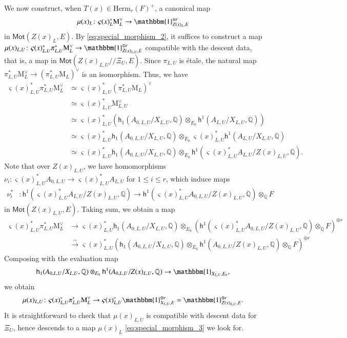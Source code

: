 \documentclass[12pt]{amsart}
\numberwithin{equation}{section}
\theoremstyle{plain}
\theoremstyle{definition}
\theoremstyle{remark}
\renewcommand{\d}[1]{\mathbb{#1}}
\renewcommand{\r}[1]{\mathrm{#1}}
\renewcommand{\sf}[1]{\mathsf{#1}}
\renewcommand{\(}{\left(}
\renewcommand{\)}{\right)}
\renewcommand{\leq}{\leqslant}
\newcommand{\dQ}{\d Q}
\newcommand{\rM}{\r M}
\newcommand{\sfh}{\sf h}
\newcommand{\Herm}{\r{Herm}}
\newcommand{\Mot}{\sf{Mot}}
\begin{document}
We now construct, when $T(x)\in\Herm_r(F)^+$, a canonical map
\begin{align}\label{eq:special_morphism_3}
\mu(x)_L\colon\varsigma(x)_L^*\rM_L^\vee\to\mathbbm{1}_{Z(x)_L,E}^{\oplus r}
\end{align}
in $\Mot(Z(x)_L,E)$. By \eqref{eq:special_morphism_2}, it suffices to construct a map $\mu(x)_{L,U}\colon\varsigma(x)_{L,U}^*\pi_{L,U}^*\rM_L^\vee\to\mathbbm{1}_{Z(x)_{L,U},E}^{\oplus r}$ compatible with the descent data, that is, a map in $\Mot(Z(x)_{L,U}/\!\!/\Xi_U,E)$. Since $\pi_{L,U}$ is \'{e}tale, the natural map $\pi_{L,U}^*\rM_L^\vee\to(\pi_{L,U}^*\rM_L)^\vee$ is an isomorphism. Thus, we have
\begin{align*}
\varsigma(x)_{L,U}^*\pi_{L,U}^*\rM_L^\vee&\simeq
\varsigma(x)_{L,U}^*(\pi_{L,U}^*\rM_L)^\vee \\
&\simeq\varsigma(x)_{L,U}^*\rM_{L,U}^\vee \\
&\simeq\varsigma(x)_{L,U}^*\(\sfh_1(A_{0,L,U}/X_{L,U},\dQ)\otimes_{E_0}\sfh^1(A_{L,U}/X_{L,U},\dQ)\) \\
&\simeq\varsigma(x)_{L,U}^*\sfh_1(A_{0,L,U}/X_{L,U},\dQ)\otimes_{E_0}\varsigma(x)_{L,U}^*\sfh^1(A_{L,U}/X_{L,U},\dQ) \\
&\simeq\varsigma(x)_{L,U}^*\sfh_1(A_{0,L,U}/X_{L,U},\dQ)\otimes_{E_0}\sfh^1(\varsigma(x)_{L,U}^*A_{L,U}/Z(x)_{L,U},\dQ).
\end{align*}
Note that over $Z(x)_{L,U}$, we have homomorphisms $\nu_i\colon\varsigma(x)_{L,U}^*A_{0,L,U}\to\varsigma(x)_{L,U}^*A_{L,U}$ for $1\leq i\leq r$, which induce maps
\begin{align*}
\nu_i^*&\colon\sfh^1(\varsigma(x)_{L,U}^*A_{L,U}/Z(x)_{L,U},\dQ)
\to\sfh^1(\varsigma(x)_{L,U}^*A_{0,L,U}/Z(x)_{L,U},\dQ)\otimes_\dQ F
\end{align*}
in $\Mot(Z(x)_{L,U},E)$. Taking sum, we obtain a map
\begin{align*}
\varsigma(x)_{L,U}^*\pi_{L,U}^*\rM_L^\vee&\to
\varsigma(x)_{L,U}^*\sfh_1(A_{0,L,U}/X_{L,U},\dQ)\otimes_{E_0}\(\sfh^1(\varsigma(x)_{L,U}^*A_{0,L,U}/Z(x)_{L,U},\dQ)\otimes_\dQ F\)^{\oplus r} \\
&\xrightarrow\sim\varsigma(x)_{L,U}^*\(\sfh_1(A_{0,L,U}/X_{L,U},\dQ)\otimes_{E_0}\sfh^1(A_{0,L,U}/Z(x)_{L,U},\dQ)\otimes_\dQ F\)^{\oplus r}
\end{align*}
Composing with the evaluation map
\[
\sfh_1(A_{0,L,U}/X_{L,U},\dQ)\otimes_{E_0}\sfh^1(A_{0,L,U}/Z(x)_{L,U},\dQ)\to\mathbbm{1}_{X_{L,U},E_0},
\]
we obtain
\[
\mu(x)_{L,U}\colon\varsigma(x)_{L,U}^*\pi_{L,U}^*\rM_L^\vee\to\varsigma(x)_{L,U}^*\mathbbm{1}_{X_{L,U},E}^{\oplus r}
=\mathbbm{1}_{Z(x)_{L,U},E}^{\oplus r}.
\]
It is straightforward to check that $\mu(x)_{L,U}$ is compatible with descent data for $\Xi_U$, hence descends to a map $\mu(x)_L$ \eqref{eq:special_morphism_3} we look for.
\end{document}
